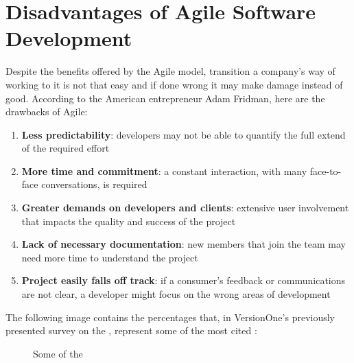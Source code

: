 \section{Disadvantages of Agile Software Development}
	Despite the benefits offered by the Agile model, transition a company's way of working to it is not that easy and if done wrong it may make damage instead of good.
	According to the American entrepreneur Adam Fridman, here are the drawbacks\cite{massive-downside-of-agile} of Agile:
	\begin{enumerate}
		\item \textbf{Less predictability}: developers may not be able to quantify the full extend of the required effort
		\item \textbf{More time and commitment}: a constant interaction, with many face-to-face conversations, is required
		\item \textbf{Greater demands on developers and clients}: extensive user involvement that impacts the quality and success of the project
		\item \textbf{Lack of necessary documentation}: new members that join the team may need more time to understand the project
		\item \textbf{Project easily falls off track}: if a consumer's feedback or communications are not clear, a developer might focus on the wrong areas of development
	\end{enumerate}
	The following image contains the percentages that, in VersionOne's previously presented survey on the \cite{state-of-agile}, represent some of the most cited :
	\begin{figure}[H]
		\centering
		\caption{Some of the }
	\end{figure}
	
